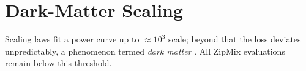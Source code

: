 \section{Dark-Matter Scaling}\label{sec:darkmatter}
Scaling laws fit a power curve up to $\approx10^{3}$ scale; beyond that the loss deviates unpredictably, a phenomenon termed \emph{dark matter} \citep{schaeffer2024predictive}.
All ZipMix evaluations remain below this threshold.

